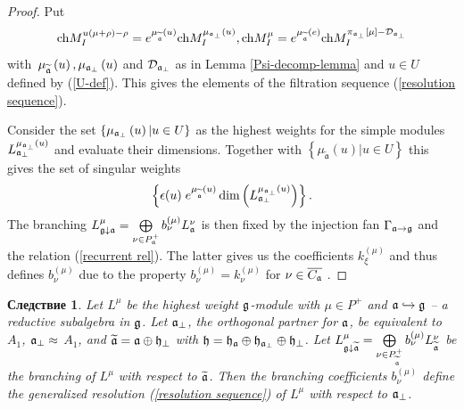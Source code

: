 \documentclass[12pt]{article}
\newtheorem{corollary}{Следствие}[theorem]
\theoremstyle{definition}
\begin{document}
\begin{proof}
Put
\begin{equation*}
\mathrm{ch}M_{I}^{u\left( \mu +\rho \right) -\rho }=e^{\mu _{\widetilde{%
\frak{a}}}\left( u\right) }\mathrm{ch}M_{I}^{\mu _{\frak{a}_{\perp }}\left(
u\right) },\mathrm{ch}M_{I}^{\mu }=e^{\mu _{\widetilde{\frak{a}}}\left(
e\right) }\mathrm{ch}M_{I}^{\pi _{\frak{a}_{\perp }}\left[ \mu \right] -%
\mathcal{D}_{\frak{a}_{\perp }}}
\end{equation*}
with\ $\mu _{\widetilde{\frak{a}}}\left( u\right) ,\mu _{\frak{a}_{\perp
}}\left( u\right) $ and $\mathcal{D}_{\frak{a}_{\perp }}$ as in Lemma \ref{Psi-decomp-lemma} and $%
u\in U$ defined by (\ref{U-def}). This gives the elements of the filtration
sequence (\ref{resolution sequence}).

Consider the set $\left\{ \mu _{\frak{a}_{\perp }}\left( u\right) |u\in
U\right\} $ as the highest weights for the simple modules $L_{\frak{a}%
_{\perp }}^{\mu _{\frak{a}_{\perp }}\left( u\right) }$ and evaluate their
dimensions. Together with
$\left\{ \mu _{\widetilde{\mathfrak{a}}}\left( u\right) |u\in
U\right\} $ this gives the set of singular weights
\begin{equation*}
\left\{ \epsilon (u)\;
e^{\mu _{\widetilde{\mathfrak{a}}}\left( u\right) }
\dim \left( L_{\frak{a}_{\perp }}^{\mu _{\frak{a}_{\perp
}}\left( u\right) }\right) \right\} .
\end{equation*}
The branching $L_{\frak{g}\downarrow \frak{a}}^{\mu }=\bigoplus\limits_{\nu
\in P_{\frak{a}}^{+}}b_{\nu }^{\left( \mu \right) }L_{\frak{a}}^{\nu }$ is
then fixed by the injection fan $\Gamma _{\frak{a}\rightarrow \frak{g}}$ and
the relation (\ref{recurrent rel}). The latter gives us the coefficients $k_{\xi
}^{\left( \mu \right) }$ and thus defines $b_{\nu }^{\left( \mu \right) }$
due to the property $b_{\nu }^{\left( \mu \right) }=k_{\nu }^{\left( \mu
\right) }$ for $\nu \in \overline{C_{\frak{a}}}$ .
\end{proof}

\begin{corollary}

Let $L^{\mu }$ be the highest weight $\frak{g}$-module with $\mu \in P^{+}$
and $\frak{a}\hookrightarrow \frak{g}$ -- a reductive subalgebra in $\frak{g}
$. Let $\frak{a}_{\perp }$, the orthogonal partner for $\frak{a}$, be
equivalent to $A_{1}$, $\frak{a}_{\perp }\approx $ $A_{1}$, and $\widetilde{%
\frak{a}}=\frak{a}\oplus \frak{h}_{\perp }$ with $\frak{h=\frak{h}_{\frak{a}}%
}\oplus \frak{h}_{\frak{a}_{\perp }}\oplus \frak{h}_{\perp }$. Let $L_{%
\frak{g}\downarrow \widetilde{\frak{a}}}^{\mu }=\bigoplus\limits_{\nu \in P_{%
\widetilde{\frak{a}}}^{+}}b_{\nu }^{\left( \mu \right) }L_{\widetilde{\frak{a%
}}}^{\nu }$ be the branching of $L^{\mu }$ with respect to $\widetilde{\frak{%
a}}$. Then the branching coefficients $b_{\nu }^{\left( \mu \right) }$
define the generalized resolution (\ref{resolution sequence}) of $L^{\mu }$
with respect to $\frak{a}_{\perp }$.
\end{corollary}
\end{document}
